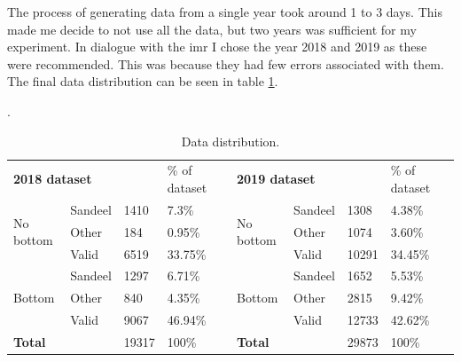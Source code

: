         The process of generating data from a single year took around 1 to 3 days. This made me decide to not use all the data, but two years was sufficient for my experiment. In dialogue with the \gls{imr} I chose the year 2018 and 2019 as these were recommended. This was because they had few errors associated with them. The final data distribution can be seen in table \ref{data_distribution_table}.
        
        \clearpage
        \begin{table}[H]
        \caption{Data distribution.}.
        \begin{tabular}{|llll|l|l|lllll|l|l}
        \cline{1-5} \cline{7-12}
        \multicolumn{4}{|l|}{\textbf{2018 dataset}}                                             & \% of dataset &  & \multicolumn{5}{l|}{\textbf{2019 dataset}}                                             & \% of dataset &  \\ \cline{1-5} \cline{7-12}
        \multicolumn{2}{|l|}{\multirow{3}{*}{No bottom}} & \multicolumn{1}{l|}{Sandeel} & 1410  & 7.3\%         &  & \multicolumn{3}{l|}{\multirow{3}{*}{No bottom}} & \multicolumn{1}{l|}{Sandeel} & 1308  & 4.38\%        &  \\ \cline{3-5} \cline{10-12}
        \multicolumn{2}{|l|}{}                           & \multicolumn{1}{l|}{Other}   & 184   & 0.95\%        &  & \multicolumn{3}{l|}{}                           & \multicolumn{1}{l|}{Other}   & 1074  & 3.60\%         &  \\ \cline{3-5} \cline{10-12}
        \multicolumn{2}{|l|}{}                           & \multicolumn{1}{l|}{Valid}   & 6519  & 33.75\%       &  & \multicolumn{3}{l|}{}                           & \multicolumn{1}{l|}{Valid}   & 10291 & 34.45\%       &  \\ \cline{1-5} \cline{7-12}
        \multicolumn{2}{|l|}{\multirow{3}{*}{Bottom}}    & \multicolumn{1}{l|}{Sandeel} & 1297  & 6.71\%        &  & \multicolumn{3}{l|}{\multirow{3}{*}{Bottom}}    & \multicolumn{1}{l|}{Sandeel} & 1652  & 5.53\%        &  \\ \cline{3-5} \cline{10-12}
        \multicolumn{2}{|l|}{}                           & \multicolumn{1}{l|}{Other}   & 840   & 4.35\%        &  & \multicolumn{3}{l|}{}                           & \multicolumn{1}{l|}{Other}   & 2815  & 9.42\%        &  \\ \cline{3-5} \cline{10-12}
        \multicolumn{2}{|l|}{}                           & \multicolumn{1}{l|}{Valid}   & 9067  & 46.94\%       &  & \multicolumn{3}{l|}{}                           & \multicolumn{1}{l|}{Valid}   & 12733 & 42.62\%       &  \\ \cline{1-5} \cline{7-12}
        \multicolumn{3}{|l|}{\textbf{Total}}                                            & 19317 & 100\%         &  & \multicolumn{4}{l|}{\textbf{Total}}                                            & 29873 & 100\%         &  \\ \cline{1-5} \cline{7-12}
        \end{tabular}
        \label{data_distribution_table}
        \end{table}
        

